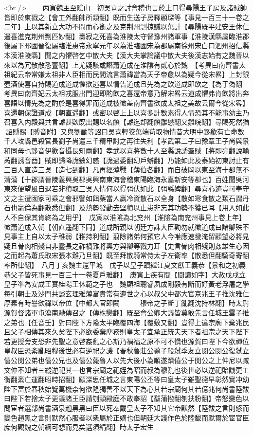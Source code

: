<br />
　　丙寅魏主至隂山　初吳喜之討會稽也言於上曰得尋陽王子房及諸賊帥皆即於東戮之【會工外翻帥所類翻】既而生送子房釋顧琛等【事見一百三十一卷之二年】上以其新立大功不問而心銜之及克荆州剽掠贓以萬計【尋陽既平建安王休仁遣喜進克荆州剽匹妙翻】壽寂之死喜為淮陵太守督豫州諸軍事【淮陵漢縣屬臨淮郡後屬下邳國晉復屬臨淮惠帝永寧元年以為淮臨國宋為郡屬南徐州宋白曰泗州招信縣本漢淮陵縣】聞之内懼啓乞中散大夫【漢大夫掌論議中散大夫後漢志始有之魏晉以來以為冗散散悉亶翻】上尤疑駭或譖蕭道成在淮隂有貳心於魏　【考異曰南齊書太祖紀云帝常嫌太祖非人臣相而民間流言蕭諱當為天子帝愈以為疑今從宋畧】上封銀壺酒使喜自持賜道成道成懼欲逃喜以情告道成且先為之飲道成即飲之【為于偽翻　考異曰南齊妃云太祖戎服出門迎即酌飲之喜還帝意乃解宋畧云道成懼弗肯飲將出奔喜語以情先為之酌於是喜得罪而道成被徵盖南齊書欲成太祖之美故云爾今從宋畧】喜還朝保證道成【朝直遥翻】或密以啓上上以喜多計數素得人情恐其不能事幼主乃召喜入内殿與共言謔甚欵既出賜以名饌【謔迄却翻饌雛戀翻又雛皖翻】尋賜死然猶詔賻賜【賻音附】又與劉勔等詔曰吳喜輕狡萬端苟取物情昔大明中黟歙有亡命數千人攻縣邑殺官長劉子尚遣三千精甲討之再往失利【孝武第二子曰豫章王子尚與景和同母也黟音伊歙音攝長知兩翻】孝武以喜將數十人至縣說誘羣賊【將即亮翻說輸芮翻誘音酉】賊即歸降詭數幻惑【詭過委翻幻戶辦翻】乃能如此及泰始初東討止有三百人直造三吳【造七到翻】凡再經薄戰【薄伯各翻】而自破岡以東至海十郡無不清蕩【十郡謂晉陵義興吳郡吳興南東海會稽東陽臨海永嘉新安等郡也】百姓聞吳河東來便望風自退若非積取三吳人情何以得弭伏如此【弭緜婢翻】尋喜心迹豈可奉守文之主遭國家可乘之會邪譬如餌藥當人羸冷資散石以全身【散如寒食散之類石謂丹石也羸倫為翻散悉但翻】及熱勢發動去堅積以止患非忘其功勢不獲已耳【用人如此人不自保其肯終為之用乎】　戊寅以淮隂為北兖州【淮隂為南兖州事見上卷上年】徵蕭道成入朝【朝直遥翻下同】道成所親以朝廷方誅大臣勸勿就徵道成曰諸卿殊不見事主上自以太子稚弱【稚持利翻】翦除諸弟何預它人今唯應速發淹留顧望必將見疑且骨肉相殘自非靈長之祚禍難將興方與卿等戮力耳【史言骨肉相殘則姦雄生心因之而起為蕭氏取宋張本難乃旦翻】既至拜散騎常侍太子左衛率【散悉但翻騎奇寄翻率所律翻】　八月丁亥魏主還平城　戊子以皇子躋繼江夏文獻王義恭【景和之初義恭父子皆死事見一百三十一卷夏戶雅翻】　庚寅上疾有間【間讀如字】大赦戊戌立皇子凖為安成王實桂陽王休範之子也　魏顯祖聰睿夙成剛毅有斷而好黃老浮屠之學每引朝士及沙門共談玄理雅薄富貴常有遺世之心以叔父中都大官京兆王子推沈雅仁厚素有時譽欲禪以帝位【中都大官即闕　　　穆帝之子斷丁亂翻沈持林翻】時太尉源賀督諸軍屯漠南馳傳召之【傳株戀翻】既至會公卿大議皆莫敢先言任城王雲子推之弟也【任音壬】對曰陛下方隆太平臨覆四海【覆敷又翻】豈得上違宗廟下棄兆民且父子相傳其來久矣陛下必欲委棄塵務則皇太子宜承正統夫天下者祖宗之天下陛下若更授旁支恐非先聖之意啓姦亂之心斯乃禍福之原不可不愼也源賀曰陛下今欲禪位皇叔臣恐紊亂昭穆後世必有逆祀之譏【春秋魯莊公薨子般弑季友立閔公閔公復弑立僖公閔公弟也僖公兄也及僖公薨魯人以先大後小為順遂躋僖公于閔公之上仲尼以臧文仲不知者三縱逆祀其一也言宗廟之祀姪為昭而叔為穆亂也後世必以逆祀貽譏更工衡翻紊亡運翻昭時招翻】願深思任城之言東陽公丕等曰皇太子雖聖德早彰然實冲幼陛下富於春秋始覽萬機柰何欲隆獨善不以天下為心其若宗廟何其若億兆何尚書陸馛曰陛下若捨太子更議諸王臣請刎頸殿庭不敢奉詔【馛蒲撥翻刎扶粉翻】帝怒變色以問宦者選部尚書酒泉趙黑黑曰臣以死奉戴皇太子不知其它帝默然【陸馛之言則怒而變色趙黑之言則默然心服者以衆屬於正嫡也但朝廷大議作色於陸馛而默爾於宦官臣庶何觀魏之朝綱可想而見矣選須絹翻】時太子宏生